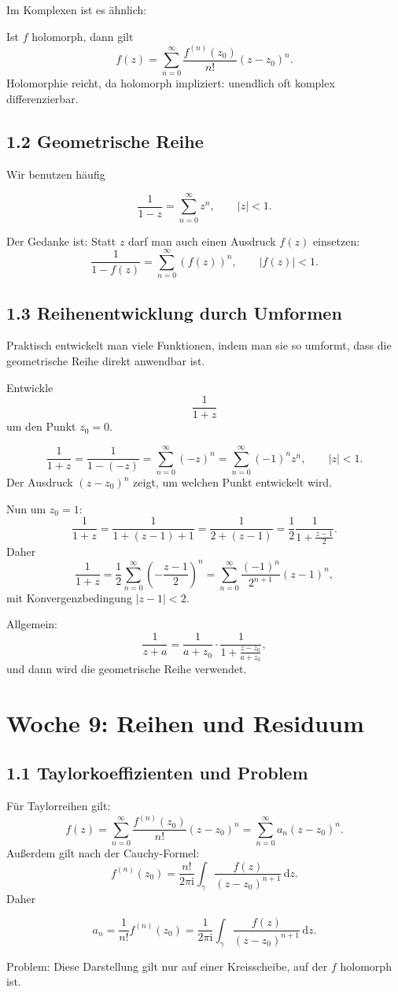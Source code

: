 \documentclass[11pt,a4paper]{article}
\newcommand{\ii}{\mathrm i}
\newcommand{\dd}{\,\mathrm d}
\begin{document}
Im Komplexen ist es ähnlich:
\begin{importantbox}
Ist $f$ holomorph, dann gilt
\[
f(z)=\sum_{n=0}^{\infty}\frac{f^{(n)}(z_0)}{n!}(z-z_0)^n.
\]
Holomorphie reicht, da holomorph impliziert: unendlich oft komplex differenzierbar.
\end{importantbox}

\subsection{1.2 Geometrische Reihe}
Wir benutzen häufig
\begin{importantbox}
\[
\frac1{1-z}=\sum_{n=0}^{\infty}z^n,
\qquad |z|<1.
\]
\end{importantbox}
Der Gedanke ist: Statt $z$ darf man auch einen Ausdruck $f(z)$ einsetzen:
\[
\frac1{1-f(z)}=\sum_{n=0}^{\infty}(f(z))^n,
\qquad |f(z)|<1.
\]

\subsection{1.3 Reihenentwicklung durch Umformen}
Praktisch entwickelt man viele Funktionen, indem man sie so umformt, dass die geometrische Reihe direkt anwendbar ist.

\begin{beispielbox}
Entwickle
\[
\frac1{1+z}
\]
um den Punkt $z_0=0$.
\end{beispielbox}
\[
\frac1{1+z}=\frac1{1-(-z)}=\sum_{n=0}^{\infty}(-z)^n
=\sum_{n=0}^{\infty}(-1)^nz^n,
\qquad |z|<1.
\]
Der Ausdruck $(z-z_0)^n$ zeigt, um welchen Punkt entwickelt wird.

Nun um $z_0=1$:
\[
\frac1{1+z}=\frac1{1+(z-1)+1}=\frac1{2+(z-1)}
=\frac12\frac1{1+\frac{z-1}{2}}.
\]
Daher
\[
\frac1{1+z}=\frac12\sum_{n=0}^{\infty}\left(-\frac{z-1}{2}\right)^n
=\sum_{n=0}^{\infty}\frac{(-1)^n}{2^{n+1}}(z-1)^n,
\]
mit Konvergenzbedingung $|z-1|<2$.

\begin{importantbox}
Allgemein:
\[
\frac1{z+a}=\frac1{a+z_0}\cdot\frac1{1+\frac{z-z_0}{a+z_0}},
\]
und dann wird die geometrische Reihe verwendet.
\end{importantbox}

\section{Woche 9: Reihen und Residuum}

\subsection{1.1 Taylorkoeffizienten und Problem}
Für Taylorreihen gilt:
\[
f(z)=\sum_{n=0}^{\infty}\frac{f^{(n)}(z_0)}{n!}(z-z_0)^n
=\sum_{n=0}^{\infty}a_n(z-z_0)^n.
\]
Außerdem gilt nach der Cauchy-Formel:
\[
f^{(n)}(z_0)=\frac{n!}{2\pi\ii}\int_\gamma\frac{f(z)}{(z-z_0)^{n+1}}\dd z.
\]
Daher
\begin{importantbox}
\[
a_n=\frac{1}{n!}f^{(n)}(z_0)
=\frac1{2\pi\ii}\int_\gamma\frac{f(z)}{(z-z_0)^{n+1}}\dd z.
\]
\end{importantbox}
Problem: Diese Darstellung gilt nur auf einer Kreisscheibe, auf der $f$ holomorph ist.
\end{document}

